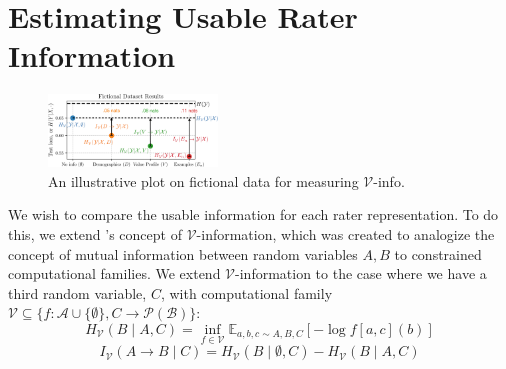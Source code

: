 \documentclass[11pt]{article}
\begin{document}
\section{Estimating Usable Rater Information}
\label{sec:informationmethodology}


\begin{figure}[0.9\columnwidth]
\centering
\vspace{-40pt}
\includegraphics[width=0.4\textwidth]{files/annotated_example_v2.pdf}
\small

\caption{
An illustrative plot on fictional data for measuring $\mathcal{V}$-info.
}
\label{fig:example}
\vspace{-20pt}
\end{figure}

We wish to compare the usable information for each rater representation. To do this, we extend \citet{xu2020theoryusableinformationcomputational}'s concept of  $\mathcal{V}$-information, which was created to analogize the concept of mutual information between random variables $A,B$ to constrained computational families. We extend $\mathcal{V}$-information to the case where we have a third random variable, $C$, with computational family $\mathcal{V} \subseteq \{f: \mathscr{A} \cup \{\emptyset\}, C \to \mathcal{P}(\mathscr{B})\}$:
\begin{equation}
H_\mathcal{V}(B \mid A, C) = \inf_{f \in \mathcal{V}} \mathbb{E}_{a,b,c \sim A,B,C} [-\log f[a,c](b)]
\end{equation}
\begin{equation}
I_\mathcal{V}(A \to B \mid C) = H_\mathcal{V}(B \mid \emptyset, C) - H_\mathcal{V}(B \mid A, C)
\end{equation}
\end{document}
